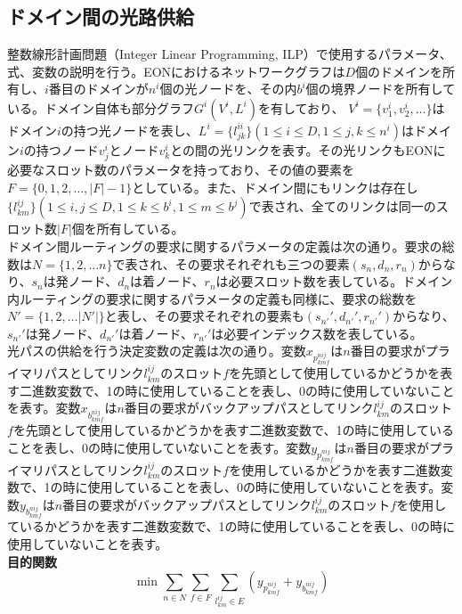 \documentclass[a4j,twocolumn,fleqn]{jarticle}
\begin{document}
\subsection{ドメイン間の光路供給}
整数線形計画問題（Integer Linear Programming, ILP）で使用するパラメータ、式、変数の説明を行う。EONにおけるネットワークグラフは$D$個のドメインを所有し、$i$番目のドメインが$n^i$個の光ノードを、その内$b^i$個の境界ノードを所有している。ドメイン自体も部分グラフ$G^i (V^i ,L^i)$を有しており、 $V^i = \{v^i_1,v^i_2, \dots \} $はドメイン$i$の持つ光ノードを表し、$L^i = \{l^{ii}_{jk}\}(1\leq i \leq D,1\leq j,k \leq n^i)$はドメイン$i$の持つノード$v^i_j$とノード$v^i_k$との間の光リンクを表す。その光リンクもEONに必要なスロット数のパラメータを持っており、その値の要素を$F=\{0,1,2,\dots ,|F|-1\}$としている。また、ドメイン間にもリンクは存在し$\{l^{ij}_{km}\}(1\leq i,j\leq D,1\leq k\leq b^i,1\leq m \leq b^j)$で表され、全てのリンクは同一のスロット数$|F|$個を所有している。\\
ドメイン間ルーティングの要求に関するパラメータの定義は次の通り。要求の総数は$N=\{1,2,\dots n\}$で表され、その要求それぞれも三つの要素$(s_n,d_n,r_n)$からなり、$s_n$は発ノード、$d_n$は着ノード、$r_n$は必要スロット数を表している。ドメイン内ルーティングの要求に関するパラメータの定義も同様に、要求の総数を$N'=\{1,2,\dots |N'|\}$と表し、その要求それぞれの要素も$(s_{n'}',d_{n'}',r_{n'}')$からなり、$s_{n'}'$は発ノード、$d_{n'}'$は着ノード、$r_{n'}'$は必要インデックス数を表している。\\
光パスの供給を行う決定変数の定義は次の通り。変数$x_{p^{nij}_{kmf}}$は$n$番目の要求がプライマリパスとしてリンク$l^{ij}_{km}$のスロット$f$を先頭として使用しているかどうかを表す二進数変数で、1の時に使用していることを表し、0の時に使用していないことを表す。変数$x_{b^{nij}_{kmf}}$は$n$番目の要求がバックアップパスとしてリンク$l^{ij}_{km}$のスロット$f$を先頭として使用しているかどうかを表す二進数変数で、1の時に使用していることを表し、0の時に使用していないことを表す。変数$y_{p^{nij}_{kmf}}$は$n$番目の要求がプライマリパスとしてリンク$l^{ij}_{km}$のスロット$f$を使用しているかどうかを表す二進数変数で、1の時に使用していることを表し、0の時に使用していないことを表す。変数$y_{b^{nij}_{kmf}}$は$n$番目の要求がバックアップパスとしてリンク$l^{ij}_{km}$のスロット$f$を使用しているかどうかを表す二進数変数で、1の時に使用していることを表し、0の時に使用していないことを表す。\\
{\large \bf 目的関数}
\begin{equation}%
\displaystyle \min \sum_{n \in N} \sum_{f \in F} \sum_{l^{ij}_{km} \in E}(y_{p^{nij}_{kmf}} + y_{b^{nij}_{kmf}})
\end{equation}
\end{document}
